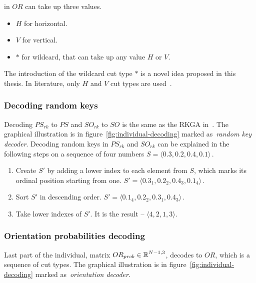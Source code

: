  in $OR$  can take up three values.
\begin{itemize}
    \item $H$ for horizontal.
    \item $V$ for vertical.
    \item $*$ for wildcard, that can take up any value $H$ or $V$.
\end{itemize}

The introduction of the wildcard cut type $*$ is a novel idea proposed in this thesis.
In literature, only $H$ and $V$ cut types are used~\cite{friedrichIntegratedSlicingTree2018, changSlicingTreeRepresentation2013, liuMultiimprovedGeneticAlgorithm2012, hwangGeneticAlgorithmApproach2009}.

\subsubsection*{Decoding random keys}

Decoding $PS_{rk}$ to $PS$ and $SO_{rk}$ to $SO$ is the same as the RKGA in~\cite{beanGeneticAlgorithmsRandom1994}.
The graphical illustration is in figure~\ref{fig:individual-decoding} marked as~\textit{random key decoder}.
Decoding random keys in $PS_{rk}$ and  $SO_{rk}$ can be explained in the following steps on a sequence of four numbers $S = \langle 0.3, 0.2, 0.4, 0.1 \rangle$\,.

\begin{enumerate}
    \item Create $S'$ by adding a lower index to each element from $S$, which marks its ordinal position starting from one.
    $S' = \langle 0.3_1, 0.2_2, 0.4_3, 0.1_4 \rangle$\,.
    \item Sort $S'$ in descending order. $S' = \langle 0.1_4, 0.2_2,  0.3_1, 0.4_3 \rangle$\,.
    \item Take lower indexes of $S'$.
    It is the result – $\langle 4, 2, 1, 3 \rangle$.
\end{enumerate}


\subsubsection*{Orientation probabilities decoding}

Last part of the individual, matrix $OR_{prob} \in \operatorname*{\mathbb{R}}^{N-1, 3}$, decodes to $OR$, which is a sequence of cut types.
The graphical illustration is in figure~\ref{fig:individual-decoding} marked as~\textit{orientation decoder}.

